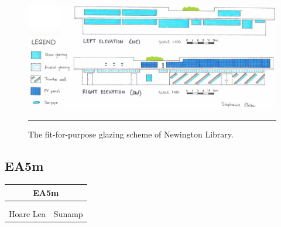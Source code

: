 \begin{figure}[htbp]
	\centering
	\includegraphics[width=\textwidth]{figures/NL-nl.png}
	\rule{\textwidth}{0.5pt} %
	\caption{The fit-for-purpose glazing scheme of Newington Library.}
	\label{fig:nl}
\end{figure}










\subsection*{EA5m}

\begin{table}
	\begin{tabular}{|ll|}
		\hline
		\multicolumn{2}{|c|}{\cellcolor[HTML]{F8A102}\textbf{EA5m \master}} \\ \hline
		\EnBldgs & \PRJ \\
		\DST & \ICP \\
		Hoare Lea & Sunamp \\ \hline
	\end{tabular}
\end{table}

